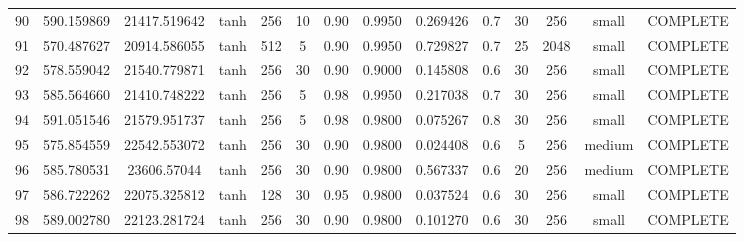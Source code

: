 \begin{longtable}{cccccccccccccc}
                       90 &                 590.159869 &                       21417.519642 &            tanh &         256 &             10 &        0.90 & 0.9950 &       0.269426 &             0.7 &                 30 &      256 &     small & COMPLETE \\
                       91 &                 570.487627 &                       20914.586055 &            tanh &         512 &              5 &        0.90 & 0.9950 &       0.729827 &             0.7 &                 25 &     2048 &     small & COMPLETE \\
                       92 &                 578.559042 &                       21540.779871 &            tanh &         256 &             30 &        0.90 & 0.9000 &       0.145808 &             0.6 &                 30 &      256 &     small & COMPLETE \\
                       93 &                 585.564660 &                       21410.748222 &            tanh &         256 &              5 &        0.98 & 0.9950 &       0.217038 &             0.7 &                 30 &      256 &     small & COMPLETE \\
                       94 &                 591.051546 &                       21579.951737 &            tanh &         256 &              5 &        0.98 & 0.9800 &       0.075267 &             0.8 &                 30 &      256 &     small & COMPLETE \\
                       95 &                 575.854559 &                       22542.553072 &            tanh &         256 &             30 &        0.90 & 0.9800 &       0.024408 &             0.6 &                  5 &      256 &    medium & COMPLETE \\
                       96 &                 585.780531 &                        23606.57044 &            tanh &         256 &             30 &        0.90 & 0.9800 &       0.567337 &             0.6 &                 20 &      256 &    medium & COMPLETE \\
                       97 &                 586.722262 &                       22075.325812 &            tanh &         128 &             30 &        0.95 & 0.9800 &       0.037524 &             0.6 &                 30 &      256 &     small & COMPLETE \\
                       98 &                 589.002780 &                       22123.281724 &            tanh &         256 &             30 &        0.90 & 0.9800 &       0.101270 &             0.6 &                 30 &      256 &     small & COMPLETE \\

\end{longtable}
